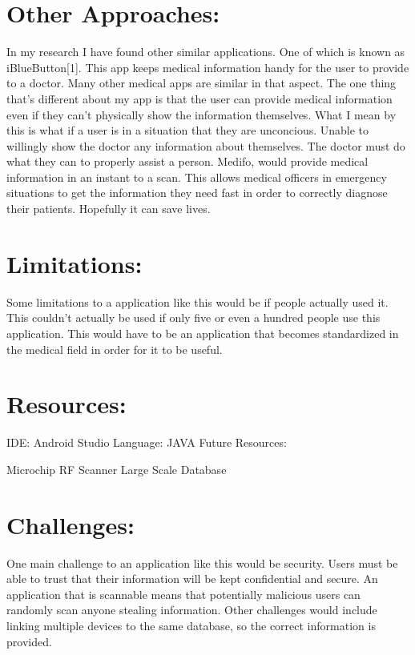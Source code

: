 \documentclass[12pt]{article}
\begin{document}
\section{Other Approaches:}
In my research I have found other similar applications. One of which is known as iBlueButton[1]. This app keeps medical information handy for the user to provide to a doctor. Many other medical apps are similar in that aspect. The one thing that's different about my app is that the user can provide medical information even if they can't physically show the information themselves. What I mean by this is what if a user is in a situation that they are unconcious. Unable to willingly show the doctor any information about themselves. The doctor must do what they can to properly assist a person. Medifo, would provide medical information in an instant to a scan. This allows medical officers in emergency situations to get the information they need fast in order to correctly diagnose their patients. Hopefully it can save lives.

\section{Limitations:}
Some limitations to a application like this would be if people actually used it. This couldn't actually be used if only five or even a hundred people use this application. This would have to be an application that becomes standardized in the medical field in order for it to be useful. 

\section{Resources:}
IDE: Android Studio\newline
Language: JAVA\newline
\newline
Future Resources:\newline
\begin{enumerate}
Microchip\newline
RF Scanner\newline
Large Scale Database

\end{enumerate}

\section{Challenges:}
One main challenge to an application like this would be security. Users must be able to trust that their information will be kept confidential and secure. An application that is scannable means that potentially malicious users can randomly scan anyone stealing information. Other challenges would include linking multiple devices to the same database, so the correct information is provided.
\end{document}
